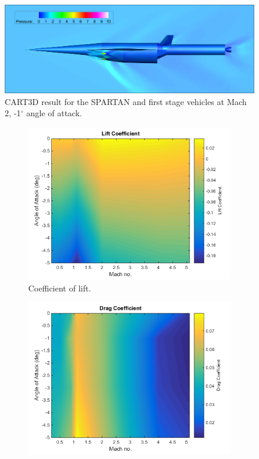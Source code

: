   
  
  \begin{figure}
  	\centering
  	\includegraphics[width=0.7\linewidth]{figures/3_vehicle_design/CARTcontour}
  	\caption{CART3D result for the SPARTAN and first stage vehicles at Mach 2, -1$^\circ$ angle of attack.}
  	\label{fig:CARTcontour}
  \end{figure}

\begin{figure}
	\begin{subfigure}{.5\textwidth}
		\centering
		\includegraphics[width=0.99\linewidth]{figures/3_vehicle_design/FirstStageCl}
		\caption{Coefficient of lift.}
		\label{fig:Cl-FirstStage}
	\end{subfigure}
	\begin{subfigure}{.5\textwidth}
		\centering
		\includegraphics[width=0.99\linewidth]{figures/3_vehicle_design/FirstStageCd}

\end{subfigure}
\end{figure}

